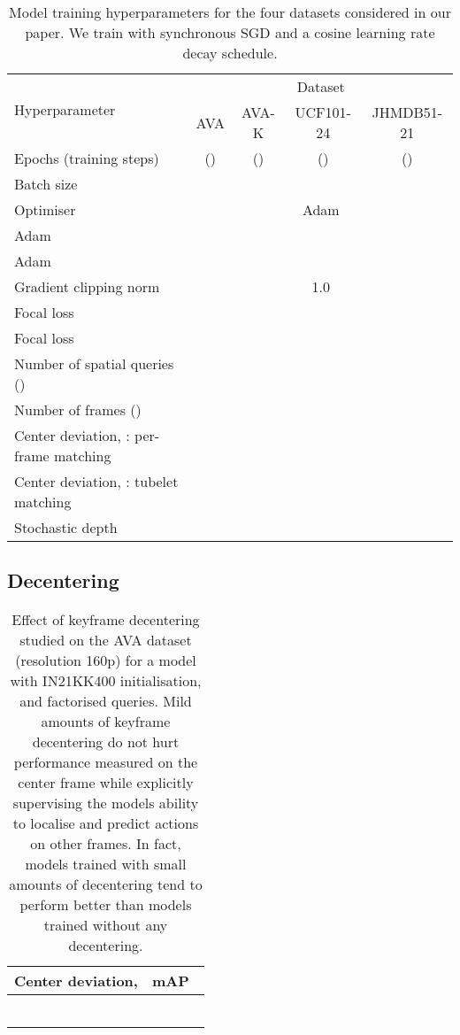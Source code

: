 \documentclass[10pt,twocolumn,letterpaper]{article}
\begin{document}
\begin{table*}[t]
\centering
\caption{Model training hyperparameters for the four datasets considered in our paper. We train with synchronous SGD and a cosine learning rate decay schedule.
}
\begin{tabular}{lcccc}
\toprule
\multirow{2}{*}{Hyperparameter} & \multicolumn{4}{c}{Dataset} \\
\cmidrule(l){2-5}
               & AVA & AVA-K & UCF101-24 & JHMDB51-21 \\
\midrule
Epochs (training steps) &  () &  () &  () &  () \\
Batch size & \multicolumn{4}{c}{} \\
Optimiser & \multicolumn{4}{c}{Adam \cite{kingma2014adam}} \\
Adam  & \multicolumn{4}{c}{} \\
Adam  & \multicolumn{4}{c}{} \\
Gradient clipping  norm & \multicolumn{4}{c}{1.0} \\
Focal loss   & \multicolumn{4}{c}{} \\
Focal loss  & \multicolumn{4}{c}{} \\
Number of spatial queries () &\multicolumn{4}{c}{} \\
Number of frames () &  &  &  &  \\
Center deviation, : per-frame matching &  &  &  &  \\
Center deviation, : tubelet matching &  &  &  &  \\
Stochastic depth~\cite{huang_stochasticdepth_eccv_2016} &  &  &  &  \\






\bottomrule
\end{tabular}
\label{tab:hyperparamters}
\end{table*}
 

\subsection{Decentering}
\label{sec:keyframe_decentering}
\begin{table}[t]
\centering
\caption{Effect of keyframe decentering studied on the AVA dataset (resolution 160p) for a model with IN21KK400 initialisation, and factorised queries.
Mild amounts of keyframe decentering do not hurt performance measured on the center frame while explicitly supervising the models ability to localise and predict actions on other frames.
In fact, models trained with small amounts of decentering tend to perform better than models trained without any decentering.
}
\begin{tabular}{cc}
\toprule
Center deviation,  & mAP~ \\  \midrule
         &    \\
      &    \\
      &    \\
      &    \\
      &    \\
     &    \\
\bottomrule
\end{tabular}
\label{tab:ablation_decentering}
\end{table}
 
\end{document}
